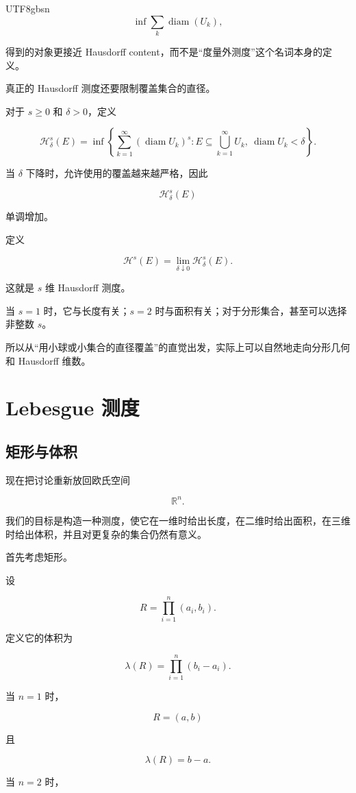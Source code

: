 \documentclass[11pt]{article}
\begin{document}
\begin{CJK*}{UTF8}{gbsn}
\[
\inf\sum_{k}\operatorname{diam}(U_{k}),
\]

得到的对象更接近 Hausdorff content，而不是“度量外测度”这个名词本身的定义。

真正的 Hausdorff 测度还要限制覆盖集合的直径。

对于 $s\geq0$ 和 $\delta>0$，定义

\[
\mathcal{H}^{s}_{\delta}(E)=\inf\left\{\sum_{k=1}^{\infty}(\operatorname{diam}U_{k})^{s}:E\subseteq\bigcup_{k=1}^{\infty}U_{k},\ \operatorname{diam}U_{k}<\delta\right\}.
\]

当 $\delta$ 下降时，允许使用的覆盖越来越严格，因此

\[
\mathcal{H}^{s}_{\delta}(E)
\]

单调增加。

定义

\[
\mathcal{H}^{s}(E)=\lim_{\delta\downarrow0}\mathcal{H}^{s}_{\delta}(E).
\]

这就是 $s$ 维 Hausdorff 测度。

当 $s=1$ 时，它与长度有关；$s=2$ 时与面积有关；对于分形集合，甚至可以选择非整数 $s$。

所以从“用小球或小集合的直径覆盖”的直觉出发，实际上可以自然地走向分形几何和 Hausdorff 维数。

\section{Lebesgue 测度}

\subsection{矩形与体积}

现在把讨论重新放回欧氏空间

\[
\mathbb{R}^{n}.
\]

我们的目标是构造一种测度，使它在一维时给出长度，在二维时给出面积，在三维时给出体积，并且对更复杂的集合仍然有意义。

首先考虑矩形。

设

\[
R=\prod_{i=1}^{n}(a_{i},b_{i}).
\]

定义它的体积为

\[
\lambda(R)=\prod_{i=1}^{n}(b_{i}-a_{i}).
\]

当 $n=1$ 时，

\[
R=(a,b)
\]

且

\[
\lambda(R)=b-a.
\]

当 $n=2$ 时，


\end{CJK*}
\end{document}
